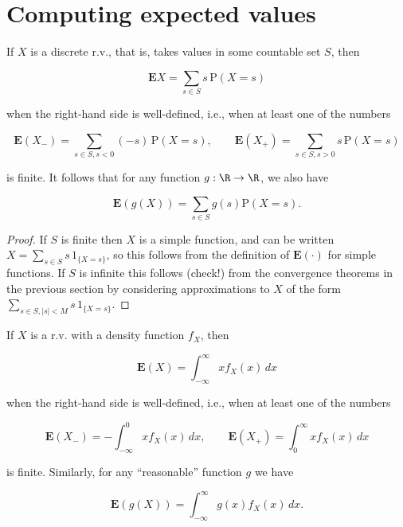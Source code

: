 \section{Computing expected values}

\begin{lem}
If $X$ is a discrete r.v., that is, takes values in
some countable set $S$, then

\[
\mathbf{E} X = \sum_{s\in S} s\, \mathrm{P}(X=s)
\]

\noindent when the right-hand side is well-defined, i.e., when
at least one of the numbers

\[
\mathbf{E}(X_-)=\sum_{s\in S, s<0} (-s)\,\mathrm{P}(X=s), \qquad \mathbf{E}(X_+)= \sum_{s\in S, s>0} s\, \mathrm{P}(X=s)
\]

\noindent is finite. It follows that for any function
$g:\R\to\R$, we also have

\[
\mathbf{E}(g(X)) = \sum_{s\in S} g(s) \mathrm{P}(X=s).
\]

\end{lem}

\begin{proof}
If $S$ is finite then $X$ is a simple function, and
can be written $X=\sum_{s\in S} s\,1_{\{X=s\}}$, so
this follows from the definition of
$\mathbf{E}(\cdot)$ for simple functions. If $S$ is
infinite this follows (check!) from the convergence
theorems in the previous section by considering
approximations to $X$ of the form
$\sum_{s\in S, |s|<M} s\, 1_{\{X=s\}}$.
\end{proof}

\begin{lem}
If $X$ is a r.v. with a density function $f_X$, then

\[
\mathbf{E}(X) = \int_{-\infty}^\infty x f_X(x)\,dx
\]

\noindent when the right-hand side is well-defined, i.e., when
at least one of the numbers

\[
\mathbf{E}(X_-) = -\int_{-\infty}^0 x f_X(x)\,dx, \qquad \mathbf{E}(X_+) = \int_0^\infty x f_X(x)\,dx
\]

\noindent is finite. Similarly, for any ``reasonable'' function
$g$ we have

\[
\mathbf{E}(g(X)) = \int_{-\infty}^\infty g(x) f_X(x)\, dx.
\]

\end{lem}

